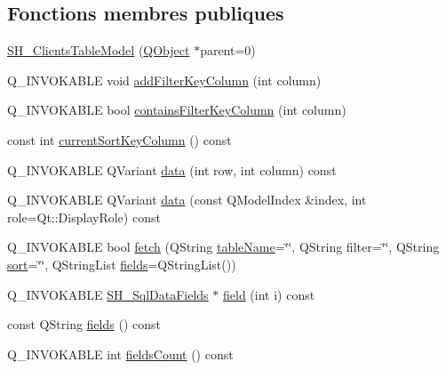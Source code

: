 \subsection*{Fonctions membres publiques}
\begin{DoxyCompactItemize}
\item 
\hyperlink{classSH__ClientsTableModel_ac0fce2c2880ff26de22fce2abb6432a3}{S\-H\-\_\-\-Clients\-Table\-Model} (\hyperlink{classQObject}{Q\-Object} $\ast$parent=0)
\item 
Q\-\_\-\-I\-N\-V\-O\-K\-A\-B\-L\-E void \hyperlink{classSH__ExtendedProxyModel_a7b432fac5c42bf84a005f2942896ca32}{add\-Filter\-Key\-Column} (int column)
\item 
Q\-\_\-\-I\-N\-V\-O\-K\-A\-B\-L\-E bool \hyperlink{classSH__ExtendedProxyModel_a81c40d3ce9710029cae19cc65bf5419d}{contains\-Filter\-Key\-Column} (int column)
\item 
const int \hyperlink{classSH__ExtendedProxyModel_adbbc1e62c72991f4ed14537cf1ba9c8f}{current\-Sort\-Key\-Column} () const 
\item 
Q\-\_\-\-I\-N\-V\-O\-K\-A\-B\-L\-E Q\-Variant \hyperlink{classSH__ExtendedProxyModel_aca6cc510f740e847e0cfc06e0adb5771}{data} (int row, int column) const 
\item 
Q\-\_\-\-I\-N\-V\-O\-K\-A\-B\-L\-E Q\-Variant \hyperlink{classSH__ExtendedProxyModel_afbc947efbe1107fc5bf8926c52902a1c}{data} (const Q\-Model\-Index \&index, int role=Qt\-::\-Display\-Role) const 
\item 
Q\-\_\-\-I\-N\-V\-O\-K\-A\-B\-L\-E bool \hyperlink{classSH__ExtendedProxyModel_a1df5323af8d29e81f22a7118227eeeb8}{fetch} (Q\-String \hyperlink{classSH__ExtendedProxyModel_abb133e196ca7cf90b9c9b57263e898d6}{table\-Name}=\char`\"{}\char`\"{}, Q\-String filter=\char`\"{}\char`\"{}, Q\-String \hyperlink{classSH__ExtendedProxyModel_a2d5fdb58bf67879e3f3130619b93104a}{sort}=\char`\"{}\char`\"{}, Q\-String\-List \hyperlink{classSH__ExtendedProxyModel_a3a69386b6070dacf320ef29e760816c1}{fields}=Q\-String\-List())
\item 
Q\-\_\-\-I\-N\-V\-O\-K\-A\-B\-L\-E \hyperlink{classSH__SqlDataFields}{S\-H\-\_\-\-Sql\-Data\-Fields} $\ast$ \hyperlink{classSH__ExtendedProxyModel_a75081819198741a532eefd5875a90678}{field} (int i) const 
\item 
const Q\-String \hyperlink{classSH__ExtendedProxyModel_a3a69386b6070dacf320ef29e760816c1}{fields} () const 
\item 
Q\-\_\-\-I\-N\-V\-O\-K\-A\-B\-L\-E int \hyperlink{classSH__ExtendedProxyModel_ab935cb0865fd2010ab35f1743adb8633}{fields\-Count} () const 

\end{DoxyCompactItemize}

